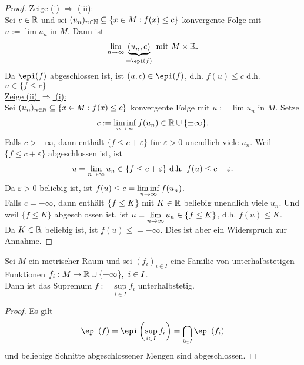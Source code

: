 \begin{proof}
\underline{Zeige (i) $\Rightarrow$ (iii):}\\
Sei $c\in\mathbb{R}$ und sei $(u_n)_{n\in\mathbb{N}}\subseteq\lbrace x\in M:f(x)\leq c\rbrace$ konvergente Folge mit $u:=\lim u_n$ in $M$. Dann ist
\begin{align*}
\limn\underbrace{(u_n,c)}_{=\epi(f)}\mit M\times\R.
\end{align*}
Da $\epi(f)$ abgeschlossen ist, ist $(u,c)\in\epi(f)$, d.h. $f(u)\leq c$ d.h. $u\in\lbrace f\leq c\rbrace$\\

\underline{Zeige (ii) $\Rightarrow$ (i):}\\
Sei $(u_n)_{n\in\mathbb{N}}\subseteq\lbrace x\in M:f(x)\leq c\rbrace$ konvergente Folge mit $u:=\lim u_n$ in $M$. Setze
\begin{align*}
c:=\liminf\limits_{n\to\infty} f(u_n)\in\mathbb{R}\cup\lbrace\pm\infty\rbrace.
\end{align*}
Falls $c>-\infty$, dann enthält $\lbrace f\leq c+\varepsilon\rbrace$ für $\varepsilon>0$ unendlich viele $u_n$. Weil $\lbrace f\leq c+\varepsilon\rbrace$ abgeschlossen ist, ist
\begin{align*}
u=\lim\limits_{n\to\infty} u_n\in\lbrace f\leq c+\varepsilon\rbrace\text{ d.h. } f(u)\leq c+\varepsilon.
\end{align*}
Da $\varepsilon>0$ beliebig ist, ist $f(u)\leq c=\liminf\limits\limits_{n\to\infty} f(u_n)$.\\
Falls $c=-\infty$, dann enthält $\lbrace f\leq K\rbrace\text{ mit } K\in\mathbb{R}$ beliebig unendlich viele $u_n$. Und weil $\lbrace f\leq K\rbrace$ abgeschlossen ist, ist $u=\lim\limits_{n\to\infty} u_n\in\lbrace f\leq K\rbrace$, d.h. $f(u)\leq K$.\\
Da $K\in\mathbb{R}$ beliebig ist, ist $f(u)\leq=-\infty$. Dies ist aber ein Widerspruch zur Annahme.
\end{proof}

\begin{lemma}
Sei $M$ ein metrischer Raum und sei $(f_i)_{i\in I}$ eine Familie von unterhalbstetigen Funktionen $f_i:M\to\mathbb{R}\cup\lbrace+\infty\rbrace,~i\in I$.\\
Dann ist das Supremum $f:=\sup\limits_{i\in I} f_i$ unterhalbstetig.
\end{lemma}
\begin{proof}
Es gilt
\begin{align*}
\epi(f)=\epi\left(\sup\limits_{i\in I} f_i\right)=\bigcap\limits_{i\in I}\epi(f_i)
\end{align*}
und beliebige Schnitte abgeschlossener Mengen sind abgeschlossen.
\end{proof}

